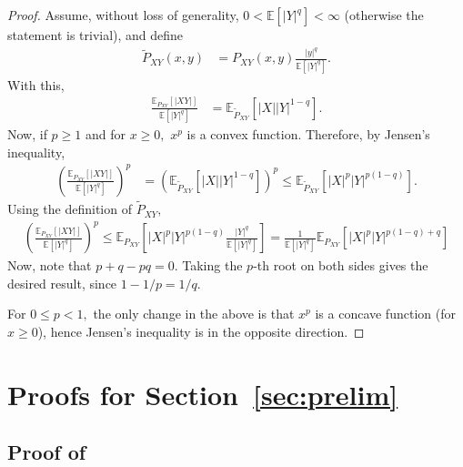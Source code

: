 \documentclass{article}
\numberwithin{theorem}{section}
\numberwithin{example}{section}
\numberwithin{remark}{section}
\numberwithin{definition}{section}
\begin{document}
\begin{proof}
Assume, without loss of generality, $0<{\mathbb E}[|Y|^q]<\infty$ (otherwise the statement is trivial), and define
\begin{align}
    \tilde{P}_{XY}(x,y) &= P_{XY}(x,y)\frac{|y|^q}{{\mathbb E}[|Y|^q]}.
\end{align}
With this,
\begin{align}
    \frac{{\mathbb E}_{P_{XY}}[|XY|]}{{\mathbb E}[|Y|^q]} &= {\mathbb E}_{\tilde{P}_{XY}}[|X||Y|^{1-q}].
\end{align}
Now, if $p\ge 1$ and for $x\ge 0,$ $x^p$ is a convex function. Therefore, by Jensen's inequality,
\begin{align}
    \left( \frac{{\mathbb E}_{P_{XY}}[|XY|]}{{\mathbb E}[|Y|^q]} \right)^p &= \left({\mathbb E}_{\tilde{P}_{XY}}[|X||Y|^{1-q}]\right)^p \le {\mathbb E}_{\tilde{P}_{XY}}[|X|^p|Y|^{p(1-q)}].
\end{align}
Using the definition of $\tilde{P}_{XY},$
\begin{align}
    \left( \frac{{\mathbb E}_{P_{XY}}[|XY|]}{{\mathbb E}[|Y|^q]} \right)^p  \le {\mathbb E}_{P_{XY}}\left[|X|^p|Y|^{p(1-q)}\frac{|Y|^q}{{\mathbb E}[|Y|^q]}\right] = \frac{1}{{\mathbb E}[|Y|^q]} {\mathbb E}_{P_{XY}}\left[|X|^p|Y|^{p(1-q)+q}\right]
\end{align}
Now, note that $p+q-pq=0.$ Taking the $p$-th root on both sides gives the desired result, since $1-1/p=1/q.$

For $0\le p <1,$ the only change in the above is that $x^p$ is a concave function (for $x\ge 0$), hence Jensen's inequality is in the opposite direction.
\end{proof}


\section{Proofs for Section~\ref{sec:prelim}}

\subsection{Proof of~}\label{app:prop:RenyiViaKL}

\end{document}
